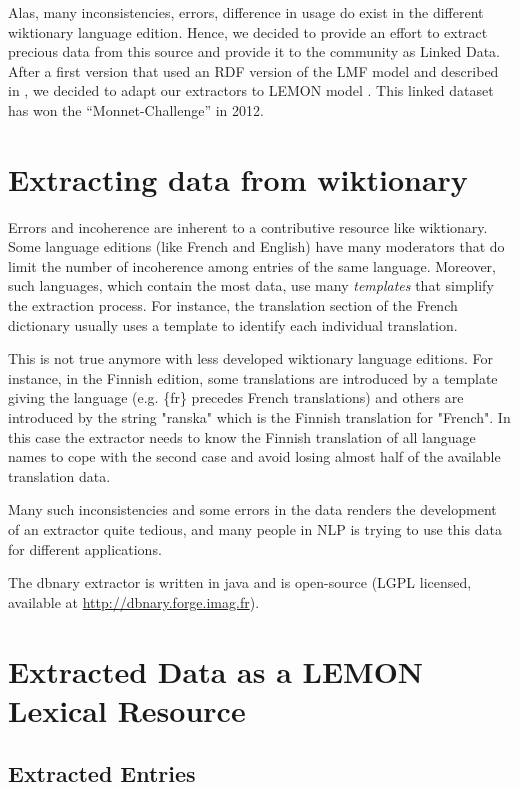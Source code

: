 \documentclass[sw]{iosart2c}
\begin{document}
Alas, many inconsistencies, errors, difference in usage do exist in the different wiktionary language edition. Hence, we decided to provide an effort to extract precious data from this source and provide it to the community as Linked Data. After a first version that used an RDF version of the LMF model \cite{FRANCOPOULO:2006:INRIA-00121468:1,francopoulo-EtAl:2006:MLRI} and described in \cite{serasset:lrec2012}, we decided to adapt our extractors to LEMON model \cite{McRae-lemon:2012}. This linked dataset has won the ``Monnet-Challenge'' in 2012.

\section{Extracting data from wiktionary}

Errors and incoherence are inherent to a contributive resource like wiktionary. Some language editions (like French and English) have many moderators that do limit the number of incoherence among entries of the same language. Moreover, such languages, which contain the most data, use many \textit{templates} that simplify the extraction process. For instance, the translation section of the French dictionary usually uses a template to identify each individual translation.

This is not true anymore with less developed wiktionary language editions. For instance, in the Finnish edition, some translations are introduced by a template giving the language (e.g. \{fr\} precedes French translations) and others are introduced by the string "ranska" which is the Finnish translation for "French". In this case the extractor needs to know the Finnish translation of all language names to cope with the second case and avoid losing almost half of the available translation data.

Many such inconsistencies and some errors in the data renders the development of an extractor quite tedious, and many people in NLP is trying to use this data for different applications. 

The dbnary extractor is written in java and is open-source (LGPL licensed, available at \url{http://dbnary.forge.imag.fr}).
\section{Extracted Data as a LEMON Lexical Resource}

\subsection{Extracted Entries}
\end{document}
